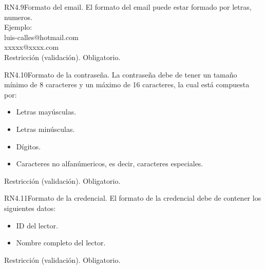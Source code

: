\begin{BussinesRule}{RN4.9}{Formato del email.} 
	\BRitem[Descripción:] El formato del email puede estar formado por letras, numeros.\\
Ejemplo:\\
	luis-calles@hotmail.com\\
	xxxxx@xxxx.com\\

	\BRitem[Tipo:] Restricción (validación).
	\BRitem[Nivel:] Obligatorio.
\end{BussinesRule}


\begin{BussinesRule}{RN4.10}{Formato de la contraseña.} 
	\BRitem[Descripción:] La contraseña debe de tener un tamaño mínimo de 8 caracteres y un máximo de 16 caracteres, la cual está compuesta por:
		\begin{itemize}	
			\item Letras mayúsculas.
			\item Letras minúsculas.
			\item Dígitos.
			\item Caracteres no alfanúmericos, es decir, caracteres especiales.
		\end{itemize}
	\BRitem[Tipo:] Restricción (validación).
	\BRitem[Nivel:] Obligatorio.
\end{BussinesRule}


\begin{BussinesRule}{RN4.11}{Formato de la credencial.} 
	\BRitem[Descripción:] El formato de la credencial debe de contener los siguientes datos:
		\begin{itemize}	
			\item ID del lector.
			\item Nombre completo del lector.
		\end{itemize}
	\BRitem[Tipo:] Restricción (validación).
	\BRitem[Nivel:] Obligatorio.
\end{BussinesRule}


